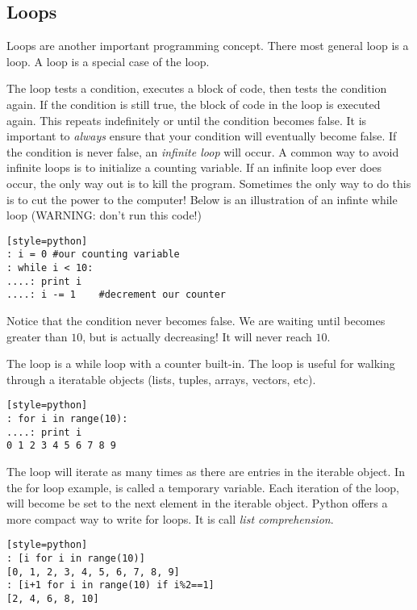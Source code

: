 \subsection*{Loops}
Loops are another important programming concept. There most general loop is a  loop.  A  loop is a special case of the  loop.

The  loop tests a condition, executes a block of code, then tests the condition again.  If the condition is still true, the block of code in the  loop is executed again.  This repeats indefinitely or until the condition becomes false.  It is important to \emph{always} ensure that your condition will eventually become false.  If the condition is never false, an \emph{infinite loop} will occur.  A common way to avoid infinite loops is to initialize a counting variable.  If an infinite loop ever does occur, the only way out is to kill the program.  Sometimes the only way to do this is to cut the power to the computer!  Below is an illustration of an infinte while loop (WARNING: don't run this code!)
\begin{lstlisting}[style=python][style=python]
: i = 0 #our counting variable
: while i < 10:
....: print i
....: i -= 1    #decrement our counter
\end{lstlisting}

Notice that the condition never becomes false.  We are waiting until  becomes greater than $10$, but  is actually decreasing!  It will never reach $10$.

The  loop is a while loop with a counter built-in.  The  loop is useful for walking through a iteratable objects (lists, tuples, arrays, vectors, etc).  
\begin{lstlisting}[style=python][style=python]
: for i in range(10):
....: print i
0 1 2 3 4 5 6 7 8 9
\end{lstlisting}

The loop will iterate as many times as there are entries in the iterable object. In the for loop example,  is called a temporary variable.  Each iteration of the loop,  will become be set to the next element in the iterable object.  Python offers a more compact way to write for loops.  It is call \emph{list comprehension}.
\begin{lstlisting}[style=python][style=python]
: [i for i in range(10)]
[0, 1, 2, 3, 4, 5, 6, 7, 8, 9]
: [i+1 for i in range(10) if i%2==1] 
[2, 4, 6, 8, 10]
\end{lstlisting}

